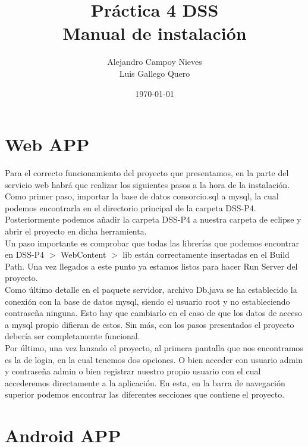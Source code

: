 \documentclass[a4paper,12pt,oneside]{article}
\title{Práctica 4 DSS \\ Manual de instalación}
\author{Alejandro Campoy Nieves \\ Luis Gallego Quero}
\date{\today}
\begin{document}
\maketitle			
 
\section{Web APP}

Para el correcto funcionamiento del proyecto que presentamos, en la parte del servicio web habrá que realizar los siguientes pasos a la hora de la instalación. \\

Como primer paso, importar la base de datos consorcio.sql a mysql, la cual podemos encontrarla en el directorio principal de la carpeta DSS-P4. Posteriormente podemos añadir la carpeta DSS-P4 a nuestra carpeta de eclipse y abrir el proyecto en dicha herramienta. \\

Un paso importante es comprobar que todas las librerías que podemos encontrar en DSS-P4 $>$ WebContent $>$ lib están correctamente insertadas en el Build Path. Una vez llegados a este punto ya estamos listos para hacer Run Server del proyecto. \\

Como último detalle en el paquete servidor, archivo Db.java se ha establecido la conexión con la base de datos mysql, siendo el usuario root y no estableciendo contraseña ninguna. Esto hay que cambiarlo en el caso de que los datos de acceso a mysql propio difieran de estos. Sin más, con los pasos presentados el proyecto debería ser completamente funcional. \\

Por último, una vez lanzado el proyecto, al primera pantalla que nos encontramos es la de login, en la cual tenemos dos opciones. O bien acceder con usuario admin y contraseña admin o bien registrar nuestro propio usuario con el cual accederemos directamente a la aplicación. En esta, en la barra de navegación superior podemos encontrar las diferentes secciones que contiene el proyecto.

\section{Android APP}
\end{document}
